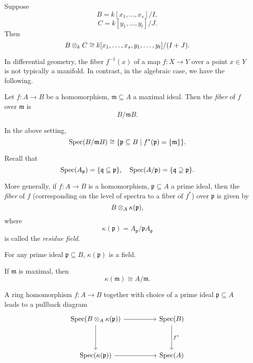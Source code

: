 \begin{corollary}
  Suppose
  \[ B = k[x_1, \dotsc, x_s] / {I},\]
  \[ C = k[y_1, \dotsc, y_t] /{J}.\]
  Then
  \[ B \otimes_k C \cong k[x_1, \dotsc, x_s, y_1, \dotsc, y_t] / {(I + J)}.\]
\end{corollary}

In differential geometry, the fiber \(f^{-1}(x)\) of a map $f \colon X \to Y$ over a point \(x \in Y\) is not typically a manifold. In contrast, in the algebraic case, we have the following.

\begin{df}
  Let $f \colon A \to B$ be a homomorphism, $\mathfrak m \subseteq A$ a maximal ideal. Then the \textit{fiber} of $f$ over $\mathfrak m$ is
  \[ B /{\mathfrak m B}.\]
\end{df}

\begin{prop}
  In the above setting,
  \[\text{Spec}(B /{\mathfrak m B}) \cong \{ \mathfrak p \subseteq B \mathrel{|} f^*(\mathfrak p) = \{ \mathfrak m \} \}.\]
\end{prop}

Recall that
\[ \text{Spec}(A_{\mathfrak p}) = \{ \mathfrak q \subseteq \mathfrak p\}, \quad
\text{Spec}(A /{\mathfrak p}) = \{ \mathfrak q \supseteq \mathfrak p\}.\]

\begin{df}
  More generally, if $f \colon A \to B$ is a homomorphism, $\mathfrak p \subseteq A$ a prime ideal, then the \textit{fiber} of $f$ (corresponding on the level of spectra to a fiber of \(f^*\)) over $\mathfrak p$ is given by
  \[ B \otimes_A \kappa(\mathfrak p),\]
  where
  \[ \kappa(\mathfrak p) = A_{\mathfrak p} / {\mathfrak p A_{\mathfrak p}}\]
  is called the \textit{residue field}.
\end{df}

\begin{prop}
  For any prime ideal $\mathfrak p \subseteq B$, $\kappa(\mathfrak p)$ is a field.
\end{prop}

\begin{note}
  If $\mathfrak m$ is maximal, then
  \[ \kappa(\mathfrak m) \cong A / {\mathfrak m}.\]
\end{note}

\begin{prop}
  A ring homomorphism \(f \colon A \to B\) together with choice of a prime ideal \(\mathfrak{p} \subseteq A\) leads to a pullback diagram
  \begin{equation*}
    \begin{tikzcd}[column sep = huge, row sep = huge]
      \spec(B \tensor_A \kappa(\mathfrak p)) \arrow{r} \arrow{d}
      & \spec(B) \arrow{d}{f^*} \\
      \spec(\kappa(\mathfrak p)) \arrow{r}
      & \spec(A)
    \end{tikzcd}
  \end{equation*}
\end{prop}




